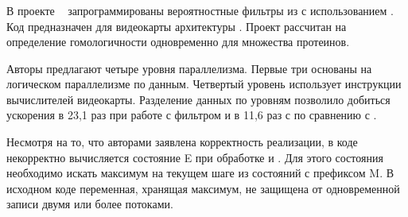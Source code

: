 \subsubsection{}
В проекте ~\cite{cudampf} запрограммированы вероятностные фильтры из 
 с использованием .
Код предназначен для видеокарты   архитектуры
.
Проект рассчитан на определение гомологичности одновременно для множества 
протеинов.

Авторы предлагают четыре уровня параллелизма.
Первые три основаны на логическом параллелизме по данным.
Четвертый уровень использует  инструкции вычислителей видеокарты.
Разделение данных по уровням позволило добиться ускорения в 23,1 раз при работе 
с фильтром  и в 11,6 раз с  по сравнению с
.

Несмотря на то, что авторами заявлена корректность реализации, в коде некорректно
вычисляется состояние E при обработке  и .
Для этого состояния необходимо искать максимум на текущем шаге из состояний с 
префиксом M.
В исходном коде  переменная, хранящая максимум, 
не защищена от одновременной записи двумя или более потоками.

